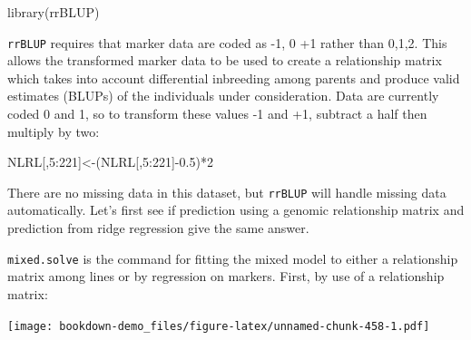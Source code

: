 \documentclass[
]{book}
\newenvironment{Shaded}{\begin{snugshade}}{\end{snugshade}}
\newcommand{\AttributeTok}[1]{\textcolor[rgb]{0.77,0.63,0.00}{#1}}
\newcommand{\DecValTok}[1]{\textcolor[rgb]{0.00,0.00,0.81}{#1}}
\newcommand{\FloatTok}[1]{\textcolor[rgb]{0.00,0.00,0.81}{#1}}
\newcommand{\FunctionTok}[1]{\textcolor[rgb]{0.00,0.00,0.00}{#1}}
\newcommand{\NormalTok}[1]{#1}
\newcommand{\OtherTok}[1]{\textcolor[rgb]{0.56,0.35,0.01}{#1}}
\newcommand{\SpecialCharTok}[1]{\textcolor[rgb]{0.00,0.00,0.00}{#1}}
\begin{document}
\begin{Shaded}
\begin{Highlighting}[]
\FunctionTok{library}\NormalTok{(rrBLUP)}
\end{Highlighting}
\end{Shaded}

\texttt{rrBLUP} requires that marker data are coded as -1, 0 +1 rather than 0,1,2. This allows the transformed marker data to be used to create a relationship matrix which takes into account differential inbreeding among parents and produce valid estimates (BLUPs) of the individuals under consideration. Data are currently coded 0 and 1, so to transform these values -1 and +1, subtract a half then multiply by two:

\begin{Shaded}
\begin{Highlighting}[]
\NormalTok{NLRL[,}\DecValTok{5}\SpecialCharTok{:}\DecValTok{221}\NormalTok{]}\OtherTok{\textless{}{-}}\NormalTok{(NLRL[,}\DecValTok{5}\SpecialCharTok{:}\DecValTok{221}\NormalTok{]}\SpecialCharTok{{-}}\FloatTok{0.5}\NormalTok{)}\SpecialCharTok{*}\DecValTok{2}
\end{Highlighting}
\end{Shaded}

There are no missing data in this dataset, but \texttt{rrBLUP} will handle missing data automatically. Let's first see if prediction using a genomic relationship matrix and prediction from ridge regression give the same answer.

\texttt{mixed.solve} is the command for fitting the mixed model to either a relationship matrix
among lines or by regression on markers. First, by use of a relationship matrix:

\begin{Shaded}
\end{Shaded}

\texttt{[image: bookdown-demo\_files/figure-latex/unnamed-chunk-458-1.pdf]}
\end{document}
